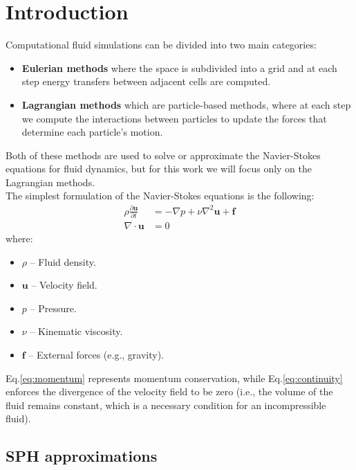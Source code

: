
\section{Introduction} %
Computational fluid simulations can be divided into two main categories: 
\begin{itemize}
    \item \textbf{Eulerian methods} where the space is subdivided into a grid and at each step energy transfers between adjacent cells are computed.
    \item \textbf{Lagrangian methods} which are particle-based methods, where at each step we compute the interactions between particles to update the forces that determine each particle's motion.
\end{itemize}
  Both of these methods are used to solve or approximate the Navier-Stokes equations for fluid dynamics, but for this work we will focus only on the Lagrangian methods.  \\

\noindent
The simplest formulation of the Navier-Stokes equations is the following:
\begin{align}
    \rho\frac{\partial \mathbf{u}}{\partial t} &= -\nabla p + \nu \nabla^2 \mathbf{u} + \mathbf{f} \label{eq:momentum} \\
    \nabla \cdot \mathbf{u} &= 0 \label{eq:continuity}
\end{align}
\noindent
where:
\begin{itemize}
\itemsep -1pt
    \item $\rho$ – Fluid density.
    \item $\mathbf{u}$ – Velocity field.
    \item $p$ – Pressure.
    \item $\nu$ – Kinematic viscosity.
    \item $\mathbf{f}$ – External forces (e.g., gravity).
\end{itemize}

\noindent
Eq.\eqref{eq:momentum} represents momentum conservation, while Eq.\eqref{eq:continuity} enforces the divergence of the velocity field to be zero (i.e., the volume of the fluid remains constant, which is a necessary condition for an incompressible fluid).

\subsection{SPH approximations}

